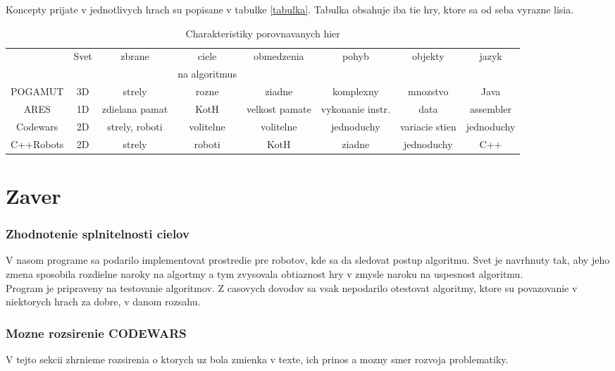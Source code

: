 Koncepty prijate v jednotlivych hrach su popisane v tabulke \ref{tabulka}. Tabulka obsahuje iba tie hry, ktore sa od seba vyrazne lisia. 
\begin{table}
\centering
\caption { Charakteristiky porovnavanych hier } %
\begin{tabular}{|c|c|c|c|c|c|c|c|}
&Svet&zbrane& ciele & obmedzenia &pohyb &objekty&jazyk \\
&&&na algoritmus &&\\
POGAMUT & 3D & strely & rozne & ziadne & komplexny &mnozstvo&Java \\
ARES & 1D & zdielana pamat & KotH & velkost pamate & vykonanie instr. & data & assembler\\
Codewars &2D & strely, roboti & volitelne & volitelne & jednoduchy&variacie stien &jednoduchy \\
C++Robots &2D& strely &roboti & KotH & ziadne & jednoduchy & C++ \\ 
\end{tabular}
\end{table}

\chapter {Zaver}
\subsection{Zhodnotenie splnitelnosti cielov}
V nasom programe sa podarilo implementovat prostredie pre robotov, kde sa da sledovat postup algoritmu. Svet je navrhnuty tak, aby jeho zmena sposobila rozdielne naroky na algortmy a tym zvysovala obtiaznost hry v zmysle naroku na uspesnost algoritmu.\\
Program je pripraveny na testovanie algoritmov. Z casovych dovodov sa vsak nepodarilo otestovat algoritmy, ktore su povazovanie v niektorych hrach za dobre, v danom rozsahu. 

\subsection{Mozne rozsirenie CODEWARS}%
V tejto sekcii zhrnieme rozsirenia o ktorych uz bola zmienka v texte, ich prinos a mozny smer rozvoja problematiky. \\
